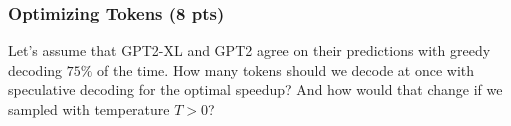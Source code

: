 \begin{answer}

\end{answer}

\subsubsection{Optimizing Tokens (8 pts)}

Let's assume that GPT2-XL and GPT2 agree on their predictions with greedy decoding $75\%$ of the time. How many tokens should we decode at once with speculative decoding for the optimal speedup? And how would that change if we sampled with temperature $T>0$?

\begin{answer}
  
\end{answer}